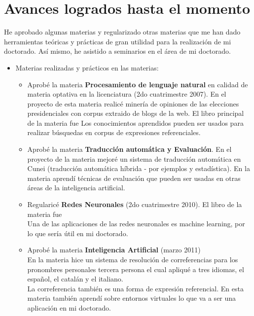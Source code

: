 \section{Avances logrados hasta el momento}
\label{progreso}

He aprobado algunas materias y regularizado otras materias que me han dado herramientas te\'oricas y pr\'acticas de gran utilidad para la realizaci\'on de mi doctorado. As\'i mismo, he asistido a seminarios en el \'area de mi doctorado.

\begin{itemize}

\item Materias realizadas y pr\'acticos en las materias:\\

\begin{itemize}
\item Aprob\'e la materia {\bf Procesamiento de lenguaje natural} en calidad de materia optativa en la licenciatura (2do cuatrimestre 2007). En el proyecto de esta materia realic\'e miner\'ia de opiniones de las elecciones presidenciales con corpus extraido de blogs de la web. El libro principal de la materia fue \cite{Manning2000}
Los conocimientos aprendidos pueden ser usados para realizar b\'usquedas en corpus de expresiones referenciales.
\item Aprob\'e la materia {\bf Traducci\'on autom\'atica y Evaluaci\'on}. En el proyecto de la materia mejor\'e un sistema de traducci\'on autom\'atica en Cunei (traducci\'on autom\'atica híbrida - por ejemplos y estadística).
En la materia aprend\'i t\'ecnicas de evaluaci\'on que pueden ser usadas en otras \'areas de la inteligencia artificial. 
\item Regularic\'e {\bf Redes Neuronales} (2do cuatrimestre 2010). El libro de la materia fue \cite{Hertz1991}\\
Una de las aplicaciones de las redes neuronales es machine learning, por lo que ser\'ia \'util en mi doctorado.
\item Aprob\'e la materia {\bf Inteligencia Artificial} (marzo 2011)\\
En la materia hice un sistema de resoluci\'on de correferencias para los pronombres personales tercera persona el cual apliqu\'e a tres idiomas, el espa\~{n}ol, el catal\'an y el italiano.\\
La correferencia tambi\'en es una forma de expresi\'on referencial. En esta materia tambi\'en aprend\'i sobre entornos virtuales lo que va a ser una aplicaci\'on en mi doctorado.

\end{itemize}
\end{itemize}

